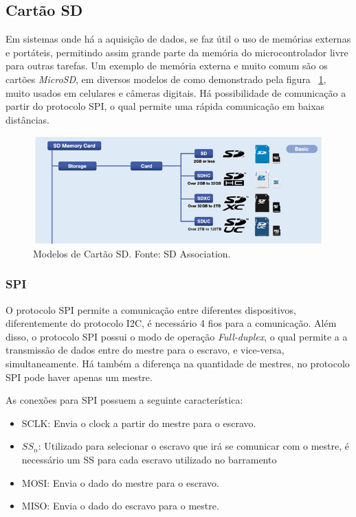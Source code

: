 \subsection{Cartão SD}

Em sistemas onde há a aquisição de dados, se faz útil o uso de memórias externas e portáteis, permitindo assim grande parte da memória do microcontrolador livre para outras tarefas. Um exemplo de memória externa e muito comum são os cartões \textit{MicroSD}, em diversos modelos de como demonstrado pela figura ~\ref{fig:SD1}, muito usados em celulares e câmeras digitais. Há possibilidade de comunicação a partir do protocolo SPI, o qual permite uma rápida comunicação em baixas distâncias.

\FloatBarrier
\begin{figure}[!htbp]
	\centering
	\includegraphics[scale=0.7]{imagens/SDCARD}
	\caption{Modelos de Cartão SD. Fonte: SD Association. %
	}
	\label{fig:SD1}
\end{figure}
\FloatBarrier

\subsubsection{SPI}

O protocolo SPI permite a comunicação entre diferentes dispositivos, diferentemente do protocolo I2C, é necessário 4 fios para a comunicação. Além disso, o protocolo SPI possui o modo de operação \textit{Full-duplex}, o qual permite a a transmissão de dados entre do mestre para o escravo, e vice-versa, simultaneamente. Há também a diferença na quantidade de mestres, no protocolo SPI pode haver apenas um mestre.

As conexões para SPI possuem a seguinte característica:
\begin{itemize}
	\item SCLK: Envia o clock a partir do mestre para o escravo.
	\item $SS_n$: Utilizado para selecionar o escravo que irá se comunicar com o mestre, é necessário um SS para cada escravo utilizado no barramento 
	\item MOSI: Envia o dado do mestre para o escravo.
	\item MISO: Envia o dado do escravo para o mestre.
\end{itemize}


